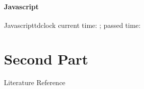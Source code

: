 \documentclass[xcolor=table]{beamer}
\begin{document}
    \subsection{Javascript}
    \begin{frame}{Javascript}{tdclock}
        current time: \tdtime; passed time: \crono
    \end{frame}

    \part{Second Part}

    \begin{frame}{Literature Reference}
        \nocite{dellaert2021neural}
        \nocite{Tewari20eurographics_neural_rendering}
        \nocite{Mildenhall20eccv_nerf}
        
    \end{frame}
\end{document}
